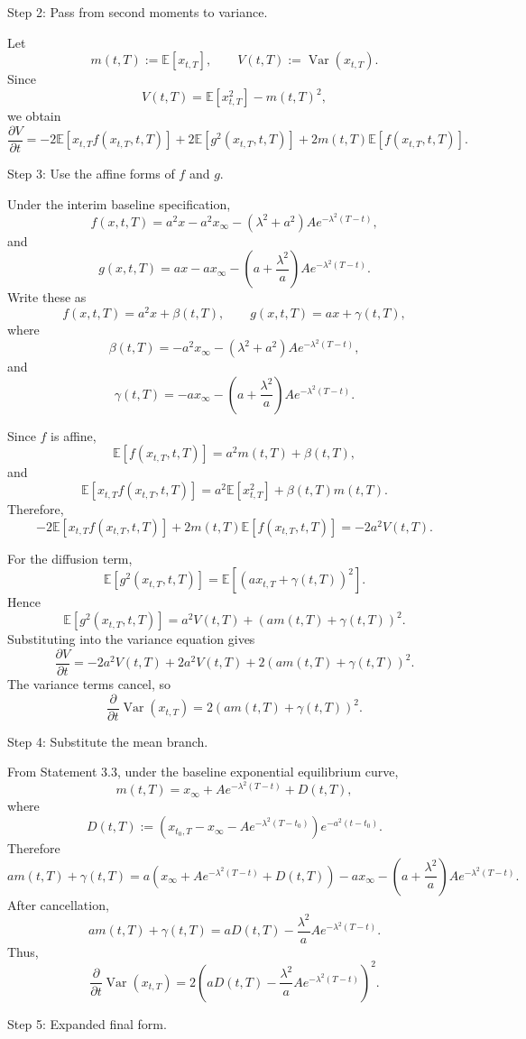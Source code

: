 \documentclass[12pt]{article}
\theoremstyle{statementstyle}
\begin{document}
\begin{appendices}
Step 2: Pass from second moments to variance.

Let
\[
m(t,T):=\mathbb E[x_{t,T}],
\qquad
V(t,T):=\operatorname{Var}(x_{t,T}).
\]
Since
\[
V(t,T)=\mathbb E[x_{t,T}^2]-m(t,T)^2,
\]
we obtain
\[
\frac{\partial V}{\partial t}
=
-2\mathbb E[x_{t,T}f(x_{t,T},t,T)]
+
2\mathbb E[g^2(x_{t,T},t,T)]
+
2m(t,T)\mathbb E[f(x_{t,T},t,T)].
\]

Step 3: Use the affine forms of \(f\) and \(g\).

Under the interim baseline specification,
\[
f(x,t,T)
=
a^2x
-
a^2x_\infty
-
(\lambda^2+a^2)Ae^{-\lambda^2(T-t)},
\]
and
\[
g(x,t,T)
=
ax
-
ax_\infty
-
\left(a+\frac{\lambda^2}{a}\right)Ae^{-\lambda^2(T-t)}.
\]
Write these as
\[
f(x,t,T)=a^2x+\beta(t,T),
\qquad
g(x,t,T)=ax+\gamma(t,T),
\]
where
\[
\beta(t,T)
=
-a^2x_\infty
-
(\lambda^2+a^2)Ae^{-\lambda^2(T-t)},
\]
and
\[
\gamma(t,T)
=
-ax_\infty
-
\left(a+\frac{\lambda^2}{a}\right)Ae^{-\lambda^2(T-t)}.
\]

Since \(f\) is affine,
\[
\mathbb E[f(x_{t,T},t,T)]
=
a^2m(t,T)+\beta(t,T),
\]
and
\[
\mathbb E[x_{t,T}f(x_{t,T},t,T)]
=
a^2\mathbb E[x_{t,T}^2]+\beta(t,T)m(t,T).
\]
Therefore,
\[
-2\mathbb E[x_{t,T}f(x_{t,T},t,T)]
+
2m(t,T)\mathbb E[f(x_{t,T},t,T)]
=
-2a^2V(t,T).
\]

For the diffusion term,
\[
\mathbb E[g^2(x_{t,T},t,T)]
=
\mathbb E[(ax_{t,T}+\gamma(t,T))^2].
\]
Hence
\[
\mathbb E[g^2(x_{t,T},t,T)]
=
a^2V(t,T)
+
\left(am(t,T)+\gamma(t,T)\right)^2.
\]
Substituting into the variance equation gives
\[
\frac{\partial V}{\partial t}
=
-2a^2V(t,T)
+
2a^2V(t,T)
+
2\left(am(t,T)+\gamma(t,T)\right)^2.
\]
The variance terms cancel, so
\[
\frac{\partial}{\partial t}\operatorname{Var}(x_{t,T})
=
2\left(am(t,T)+\gamma(t,T)\right)^2.
\]

Step 4: Substitute the mean branch.

From Statement 3.3, under the baseline exponential equilibrium curve,
\[
m(t,T)
=
x_\infty
+
Ae^{-\lambda^2(T-t)}
+
D(t,T),
\]
where
\[
D(t,T)
:=
\left(
x_{t_0,T}
-
x_\infty
-
Ae^{-\lambda^2(T-t_0)}
\right)
e^{-a^2(t-t_0)}.
\]
Therefore
\[
am(t,T)+\gamma(t,T)
=
a\left(x_\infty+Ae^{-\lambda^2(T-t)}+D(t,T)\right)
-
ax_\infty
-
\left(a+\frac{\lambda^2}{a}\right)Ae^{-\lambda^2(T-t)}.
\]
After cancellation,
\[
am(t,T)+\gamma(t,T)
=
aD(t,T)
-
\frac{\lambda^2}{a}Ae^{-\lambda^2(T-t)}.
\]
Thus,
\[
\frac{\partial}{\partial t}\operatorname{Var}(x_{t,T})
=
2\left(
aD(t,T)
-
\frac{\lambda^2}{a}Ae^{-\lambda^2(T-t)}
\right)^2.
\]

Step 5: Expanded final form.


\end{appendices}
\end{document}
